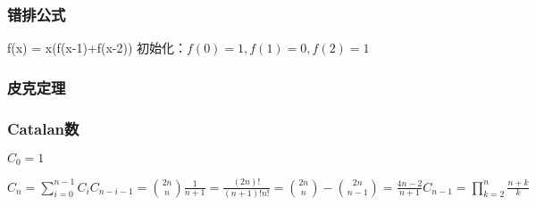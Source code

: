 \documentclass[twocolumn,a4]{article}
\begin{document}
\subsubsection{错排公式}
f(x) = x(f(x-1)+f(x-2))
初始化：$f(0)=1,f(1)=0,f(2)=1$

\subsubsection{皮克定理}


\subsubsection{Catalan数}
$C_0 = 1$

$C_n = \sum_{i=0}^{n-1}C_i C_{n-i-1} = \binom{2n}{n}\frac{1}{n+1}=\frac{(2n)!}{(n+1)!n!}=\binom{2n}{n}-\binom{2n}{n-1}=\frac{4n-2}{n+1}C_{n-1} = \prod_{k=2}^n \frac{n+k}{k}$
\end{document}
